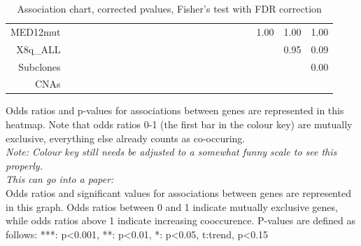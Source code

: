 \documentclass[a4paper,11pt]{article}
\begin{document}
\begin{landscape}
\begin{table}[ht]
{{\begin{tabular}{|r|c|c|c|c|c|c|c|c|c|c|c|c|c|c|c|c|c|c|c|c|c|c|}
  MED12mut &  &  &  &  &  &  &  &  &  &  &  &  &  &  &  &  &  &  &  & 1.00 & 1.00 & 1.00 \\ 
  X8q\_ALL &  &  &  &  &  &  &  &  &  &  &  &  &  &  &  &  &  &  &  &  & 0.95 & 0.09 \\ 
  Subclones &  &  &  &  &  &  &  &  &  &  &  &  &  &  &  &  &  &  &  &  &  & 0.00 \\ 
  CNAs &  &  &  &  &  &  &  &  &  &  &  &  &  &  &  &  &  &  &  &  &  &  \\ 
   \hline
\end{tabular}
}
}
\caption{Association chart, corrected pvalues, Fisher's test with FDR correction} 
\end{table} \end{landscape}

Odds ratios and p-values for associations between genes are represented in this heatmap. Note that odds ratios 0-1 (the first bar in the colour key) are mutually exclusive, everything else already counts as co-occuring.\\
\emph{Note: Colour key still needs be adjusted to a somewhat funny scale to see this properly.}\\
\emph{This can go into a paper:}\\
Odds ratios and significant values for associations between genes are represented in this graph. Odds ratios between 0 and 1 indicate mutually exclusive genes, while odds ratios above 1 indicate increasing co\-occurence. P-values are defined as follows: ***: p<0.001, **: p<0.01, *: p<0.05, t:trend, p<0.15
\end{document}
